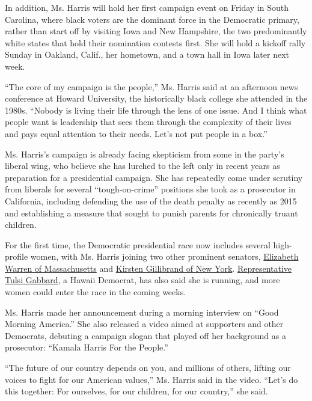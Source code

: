 In addition, Ms. Harris will hold her first campaign event on Friday in
South Carolina, where black voters are the dominant force in the
Democratic primary, rather than start off by visiting Iowa and New
Hampshire, the two predominantly white states that hold their nomination
contests first. She will hold a kickoff rally Sunday in Oakland, Calif.,
her hometown, and a town hall in Iowa later next week.

``The core of my campaign is the people,'' Ms. Harris said at an
afternoon news conference at Howard University, the historically black
college she attended in the 1980s. ``Nobody is living their life through
the lens of one issue. And I think what people want is leadership that
sees them through the complexity of their lives and pays equal attention
to their needs. Let's not put people in a box.''

Ms. Harris's campaign is already facing skepticism from some in the
party's liberal wing, who believe she has lurched to the left only in
recent years as preparation for a presidential campaign. She has
repeatedly come under scrutiny from liberals for several
``tough-on-crime'' positions she took as a prosecutor in California,
including defending the use of the death penalty as recently as 2015 and
establishing a measure that sought to punish parents for chronically
truant children.

For the first time, the Democratic presidential race now includes
several high-profile women, with Ms. Harris joining two other prominent
senators,
\href{https://www.nytimes3xbfgragh.onion/2018/12/31/us/politics/elizabeth-warren-2020-president-announcement.html}{Elizabeth
Warren of Massachusetts} and
\href{https://www.nytimes3xbfgragh.onion/2019/01/15/us/politics/gillibrand-president-election.html}{Kirsten
Gillibrand of New York}.
\href{https://www.nytimes3xbfgragh.onion/2019/01/11/us/politics/tulsi-gabbard-2020-president-announcement.html}{Representative
Tulsi Gabbard}, a Hawaii Democrat, has also said she is running, and
more women could enter the race in the coming weeks.

Ms. Harris made her announcement during a morning interview on ``Good
Morning America.'' She also released a video aimed at supporters and
other Democrats, debuting a campaign slogan that played off her
background as a prosecutor: ``Kamala Harris For the People.''

``The future of our country depends on you, and millions of others,
lifting our voices to fight for our American values,'' Ms. Harris said
in the video. ``Let's do this together: For ourselves, for our children,
for our country,'' she said.

